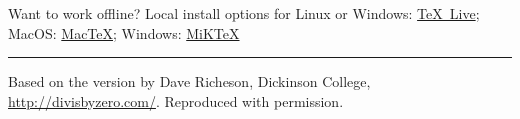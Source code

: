 \documentclass[10pt,landscape,letterpaper]{article}
\begin{document}
\begin{multicols}{3}
\vfill
Want to work offline? Local install options for Linux or Windows: \href{https://www.tug.org/texlive}{\TeX\ Live};
MacOS: \href{http://www.tug.org/mactex/}{Mac\TeX};
Windows: \href{http://miktex.org/}{MiK\TeX}
\vfill
\hrule
\vfill
Based on the version by Dave Richeson, Dickinson College, \mbox{\url{http://divisbyzero.com/}}.
Reproduced with permission.
\end{multicols}

\end{document}
